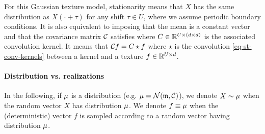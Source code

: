 For this Gaussian texture model, stationarity means that $X$ has the same distribution as $X(\cdot + \tau)$ for any shift $\tau \in U$, where we assume periodic boundary conditions. It is also equivalent to imposing that the mean is a constant vector
and that the covariance matrix $\mathcal{C}$ satisfies
where $C \in \mathbb{R}^{U \times (d \times d)}$ is the associated convolution kernel. It means that $\mathcal{C} f = C \star f$ where $\star$ is the convolution \eqref{eq-st-conv-kernels} between a kernel and a texture $f  \in \mathbb{R}^{U \times d}$.



\paragraph{Distribution vs. realizations}

In the following, if $\mu$ is a distribution (e.g. $\mu = \mathcal{N}({\frak m},\mathcal{C})$), we denote $X \sim \mu$ when the random vector $X$ has distribution $\mu$. We denote $f \equiv \mu$ when the (deterministic) vector $f$ is sampled according to a random vector having distribution $\mu$.


